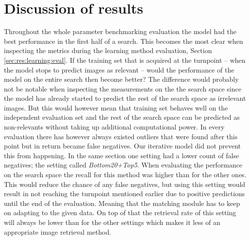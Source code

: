 
\section{Discussion of results}
\label{sec:concl:meas}
Throughout the whole parameter benchmarking evaluation the model had the best performance in the first half of a search. This becomes the most clear when inspecting the metrics during the learning method evaluation, Section \ref{sec:res:learning:eval}. If the training set that is acquired at the turnpoint -- when the model stops to predict images as relevant -- would the performance of the model on the entire search then become better? The difference would probably not be notable when inspecting the measurements on the the search space since the model has already started to predict the rest of the search space as irrelevant images. But this would however mean that training set behaves well on the independent evaluation set and the rest of the search space can be predicted as non-relevants without taking up additional computational power. In every evaluation there has however always existed outliers that were found after this point but in return became false negatives. Our iterative model did not prevent this from happening. 
In the same section one setting had a lower count of false negatives; the setting called \emph{Bottom20+Top5}. When evaluating the performance on the search space the recall for this method was higher than for the other ones. This would reduce the chance of any false negatives, but using this setting would result in not reaching the turnpoint mentioned earlier due to positive predictions until the end of the evaluation. Meaning that the matching module has to keep on adapting to the given data. On top of that the retrieval rate of this setting will always be lower than for the other settings which makes it less of an appropriate image retrieval method. 


